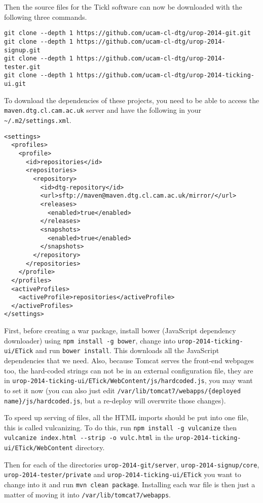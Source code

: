 \documentclass[12pt,a4paper]{article}
\newcommand{\tomcatwd}{{\tt /var/\hspace{0pt}lib/\hspace{0pt}tomcat7}}
\newcommand{\localHardcodedJs}{{\tt urop-2014-ticking-ui/\hspace{0pt}ETick/\hspace{0pt}WebContent/\hspace{0pt}js/\hspace{0pt}hardcoded.js}}
\newcommand{\deployedHardcodedJs}{\tomcatwd{\tt/\hspace{0pt}webapps/\hspace{0pt}\{deployed name\}/\hspace{0pt}js/\hspace{0pt}hardcoded.js}}
\begin{document}
Then the source files for the Tickl software can now be downloaded with the following three commands.
\begin{verbatim}
git clone --depth 1 https://github.com/ucam-cl-dtg/urop-2014-git.git
git clone --depth 1 https://github.com/ucam-cl-dtg/urop-2014-signup.git
git clone --depth 1 https://github.com/ucam-cl-dtg/urop-2014-tester.git
git clone --depth 1 https://github.com/ucam-cl-dtg/urop-2014-ticking-ui.git
\end{verbatim}

To download the dependencies of these projects, you need to be able to access the {\tt maven.dtg.cl.cam.ac.uk} server and have the following in your {\tt \~{}/.m2/settings.xml}.
\begin{verbatim}
<settings>
  <profiles>
    <profile>
      <id>repositories</id>
      <repositories>
        <repository>
          <id>dtg-repository</id>
          <url>sftp://maven@maven.dtg.cl.cam.ac.uk/mirror/</url>
          <releases>
            <enabled>true</enabled>
          </releases>
          <snapshots>
            <enabled>true</enabled>
          </snapshots>
        </repository>
      </repositories>
    </profile>
  </profiles>
  <activeProfiles>
    <activeProfile>repositories</activeProfile>
  </activeProfiles>
</settings>
\end{verbatim}

First, before creating a war package, install bower (JavaScript dependency downloader) using {\tt npm install -g bower}, change into {\tt urop-2014-ticking-ui/ETick} and run {\tt bower install}.
This downloads all the JavaScript dependencies that we need.
Also, because Tomcat serves the front-end webpages too, the hard-coded strings can not be in an external configuration file, they are in \localHardcodedJs, you may want to set it now (you can also just edit \deployedHardcodedJs, but a re-deploy will overwrite those changes).

To speed up serving of files, all the HTML imports should be put into one file, this is called vulcanizing.
To do this, run {\tt npm install -g vulcanize} then {\tt vulcanize index.html -{}-strip -o vulc.html} in the {\tt urop-2014-ticking-ui/\hspace{0pt}ETick/\hspace{0pt}WebContent} directory.

Then for each of the directories {\tt urop-2014-git/server}, {\tt urop-2014-signup/core}, {\tt urop-2014-tester/private} and {\tt urop-2014-ticking-ui/ETick} you want to change into it and run {\tt mvn clean package}.
Installing each war file is then just a matter of moving it into \tomcatwd{}{\tt/webapps}.
\end{document}
